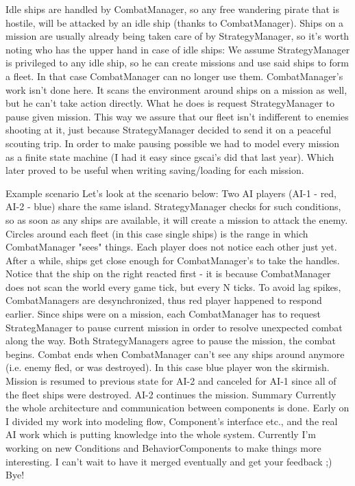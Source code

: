 Idle ships are handled by CombatManager, so any free wandering pirate that is hostile, will be attacked by an idle ship (thanks to CombatManager).
Ships on a mission are usually already being taken care of by StrategyManager, so it's worth noting who has the upper hand in case of idle ships:
We assume StrategyManager is privileged to any idle ship, so he can create missions and use said ships to form a fleet.
In that case CombatManager can no longer use them.
CombatManager's work isn't done here. It scans the environment around ships on a mission as well, but he can't take action directly.
What he does is request StrategyManager to pause given mission.
This way we assure that our fleet isn't indifferent to enemies shooting at it, just because StrategyManager decided to send it on a peaceful scouting trip.
In order to make pausing possible we had to model every mission as a finite state machine (I had it easy since gscai's did that last year).
Which later proved to be useful when writing saving/loading for each mission.

Example scenario
Let's look at the scenario below:
Two AI players (AI-1 - red, AI-2 - blue) share the same island.
StrategyManager checks for such conditions, so as soon as any ships are available, it will create a mission to attack the enemy.
Circles around each fleet (in this case single ships) is the range in which CombatManager "sees" things.
Each player does not notice each other just yet.
After a while, ships get close enough for CombatManager's to take the handles.
Notice that the ship on the right reacted first - it is because CombatManager does not scan the world every game tick, but every N ticks.
To avoid lag spikes, CombatManagers are desynchronized, thus red player happened to respond earlier.
Since ships were on a mission, each CombatManager has to request StrategManager to pause current mission in order to resolve unexpected combat along the way.
Both StrategyManagers agree to pause the mission, the combat begins.
Combat ends when CombatManager can't see any ships around anymore (i.e. enemy fled, or was destroyed).
In this case blue player won the skirmish.
Mission is resumed to previous state for AI-2 and canceled for AI-1 since all of the fleet ships were destroyed.
AI-2 continues the mission.
Summary
Currently the whole architecture and communication between components is done.
Early on I divided my work into modeling flow, Component's interface etc., and the real AI work which is putting knowledge into the whole system.
Currently I'm working on new Conditions and BehaviorComponents to make things more interesting.
I can't wait to have it merged eventually and get your feedback ;)
Bye!
